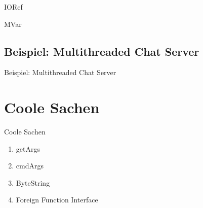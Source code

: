 \documentclass{beamer}
\begin{document}
\begin{frame}{IORef}
\end{frame}

\begin{frame}{MVar}
\end{frame}

\subsection{Beispiel: Multithreaded Chat Server}
\begin{frame}{Beispiel: Multithreaded Chat Server}
\end{frame}

\section{Coole Sachen}
\begin{frame}{Coole Sachen}
\begin{enumerate}
\item getArgs
\item cmdArgs
\item ByteString
\item Foreign Function Interface
\end{enumerate}
\end{frame}
\end{document}
